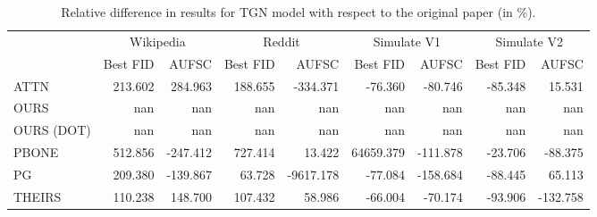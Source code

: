 \begin{table}
\centering
\begin{tabular}{lrrrrrrrr}
\toprule
 & \multicolumn{2}{c}{Wikipedia} & \multicolumn{2}{c}{Reddit} & \multicolumn{2}{c}{Simulate V1} & \multicolumn{2}{c}{Simulate V2} \\
 & Best FID & AUFSC & Best FID & AUFSC & Best FID & AUFSC & Best FID & AUFSC \\
\midrule
ATTN & 213.602 & 284.963 & 188.655 & -334.371 & -76.360 & -80.746 & -85.348 & 15.531 \\
OURS & nan & nan & nan & nan & nan & nan & nan & nan \\
OURS (DOT) & nan & nan & nan & nan & nan & nan & nan & nan \\
PBONE & 512.856 & -247.412 & 727.414 & 13.422 & 64659.379 & -111.878 & -23.706 & -88.375 \\
PG & 209.380 & -139.867 & 63.728 & -9617.178 & -77.084 & -158.684 & -88.445 & 65.113 \\
THEIRS & 110.238 & 148.700 & 107.432 & 58.986 & -66.004 & -70.174 & -93.906 & -132.758 \\
\bottomrule
\end{tabular}
\caption{\label{tab:tgn_results_diff}Relative difference in results for TGN model with respect to the original paper (in \%).}
\end{table}
